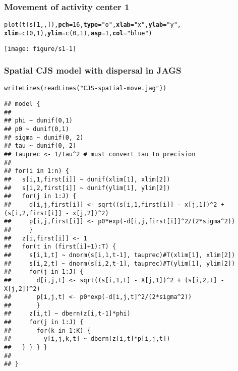 \documentclass[color=usenames,dvipsnames]{beamer}\usepackage[]{graphicx}\usepackage[]{color}
\makeatletter
\newcommand{\hlnum}[1]{\textcolor[rgb]{0.69,0.494,0}{#1}}%
\newcommand{\hlstr}[1]{\textcolor[rgb]{0.749,0.012,0.012}{#1}}%
\newcommand{\hlstd}[1]{\textcolor[rgb]{0,0,0}{#1}}%
\newcommand{\hlkwc}[1]{\textcolor[rgb]{0,0,0}{\textbf{#1}}}%
\newcommand{\hlkwd}[1]{\textcolor[rgb]{0.004,0.004,0.506}{#1}}%
\newenvironment{kframe}{%
 \def\at@end@of@kframe{}%
 \ifinner\ifhmode%
  \def\at@end@of@kframe{\end{minipage}}%
  \begin{minipage}{\columnwidth}%
 \fi\fi%
 \def\FrameCommand##1{\hskip\@totalleftmargin \hskip-\fboxsep
 \colorbox{shadecolor}{##1}\hskip-\fboxsep
     \hskip-\linewidth \hskip-\@totalleftmargin \hskip\columnwidth}%
 \MakeFramed {\advance\hsize-\width
   \@totalleftmargin\z@ \linewidth\hsize
   \@setminipage}}%
 {\par\unskip\endMakeFramed%
 \at@end@of@kframe}
\newenvironment{knitrout}{}{} %
\makeatother
\begin{document}
\begin{frame}[fragile]
  \frametitle{Movement of activity center 1}
\begin{knitrout}\scriptsize
{}\color{fgcolor}\begin{kframe}
\begin{alltt}
\hlkwd{plot}\hlstd{(}\hlkwd{t}\hlstd{(s[}\hlnum{1}\hlstd{,,]),} \hlkwc{pch}\hlstd{=}\hlnum{16}\hlstd{,} \hlkwc{type}\hlstd{=}\hlstr{"o"}\hlstd{,} \hlkwc{xlab}\hlstd{=}\hlstr{"x"}\hlstd{,} \hlkwc{ylab}\hlstd{=}\hlstr{"y"}\hlstd{,}
     \hlkwc{xlim}\hlstd{=}\hlkwd{c}\hlstd{(}\hlnum{0}\hlstd{,} \hlnum{1}\hlstd{),} \hlkwc{ylim}\hlstd{=}\hlkwd{c}\hlstd{(}\hlnum{0}\hlstd{,} \hlnum{1}\hlstd{),} \hlkwc{asp}\hlstd{=}\hlnum{1}\hlstd{,} \hlkwc{col}\hlstd{=}\hlstr{"blue"}\hlstd{)}
\end{alltt}
\end{kframe}

{\centering \texttt{[image: figure/s1-1]} 

}



\end{knitrout}
\end{frame}




\begin{frame}[fragile]
  \frametitle{Spatial CJS model with dispersal in JAGS}
  \vspace{-2mm}
  \tiny %
\begin{knitrout}\tiny
{}\color{fgcolor}\begin{kframe}
\begin{alltt}
\hlkwd{writeLines}\hlstd{(}\hlkwd{readLines}\hlstd{(}\hlstr{"CJS-spatial-move.jag"}\hlstd{))}
\end{alltt}
\begin{verbatim}
## model {
## 
## phi ~ dunif(0,1)
## p0 ~ dunif(0,1)
## sigma ~ dunif(0, 2)
## tau ~ dunif(0, 2)
## tauprec <- 1/tau^2 # must convert tau to precision
## 
## for(i in 1:n) {
##   s[i,1,first[i]] ~ dunif(xlim[1], xlim[2])
##   s[i,2,first[i]] ~ dunif(ylim[1], ylim[2])
##   for(j in 1:J) {
##     d[i,j,first[i]] <- sqrt((s[i,1,first[i]] - x[j,1])^2 + (s[i,2,first[i]] - x[j,2])^2)
##     p[i,j,first[i]] <- p0*exp(-d[i,j,first[i]]^2/(2*sigma^2))
##     }
##   z[i,first[i]] <- 1
##   for(t in (first[i]+1):T) {
##     s[i,1,t] ~ dnorm(s[i,1,t-1], tauprec)#T(xlim[1], xlim[2])
##     s[i,2,t] ~ dnorm(s[i,2,t-1], tauprec)#T(ylim[1], ylim[2])
##     for(j in 1:J) {
##       d[i,j,t] <- sqrt((s[i,1,t] - X[j,1])^2 + (s[i,2,t] - X[j,2])^2)
##       p[i,j,t] <- p0*exp(-d[i,j,t]^2/(2*sigma^2))
##       }
##     z[i,t] ~ dbern(z[i,t-1]*phi)
##     for(j in 1:J) {
##       for(k in 1:K) {
##         y[i,j,k,t] ~ dbern(z[i,t]*p[i,j,t])
##   } } } }
## 
## }
\end{verbatim}
\end{kframe}
\end{knitrout}
\end{frame}
\end{document}
